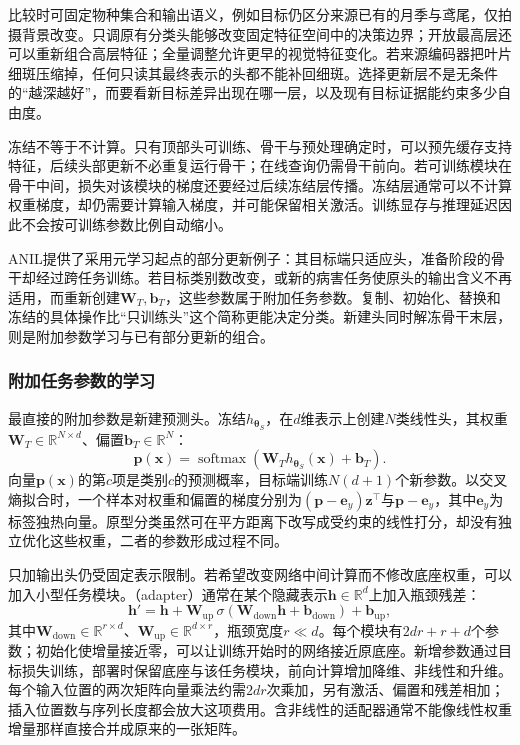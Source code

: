 比较时可固定物种集合和输出语义，例如目标仍区分来源已有的月季与鸢尾，仅拍摄背景改变。只调原有分类头能够改变固定特征空间中的决策边界；开放最高层还可以重新组合高层特征；全量调整允许更早的视觉特征变化。若来源编码器把叶片细斑压缩掉，任何只读其最终表示的头都不能补回细斑。选择更新层不是无条件的“越深越好”，而要看新目标差异出现在哪一层，以及现有目标证据能约束多少自由度。

冻结不等于不计算。只有顶部头可训练、骨干与预处理确定时，可以预先缓存支持特征，后续头部更新不必重复运行骨干；在线查询仍需骨干前向。若可训练模块在骨干中间，损失对该模块的梯度还要经过后续冻结层传播。冻结层通常可以不计算权重梯度，却仍需要计算输入梯度，并可能保留相关激活。训练显存与推理延迟因此不会按可训练参数比例自动缩小。

ANIL提供了采用元学习起点的部分更新例子：其目标端只适应头，准备阶段的骨干却经过跨任务训练。若目标类别数改变，或新的病害任务使原头的输出含义不再适用，而重新创建$\bm W_T,\bm b_T$，这些参数属于附加任务参数。复制、初始化、替换和冻结的具体操作比“只训练头”这个简称更能决定分类。新建头同时解冻骨干末层，则是附加参数学习与已有部分更新的组合。

\subsubsection{附加任务参数的学习}
\label{sec:ket-transfer-added-parameters}

最直接的附加参数是新建预测头。冻结$h_{\bm{\theta}_S}$，在$d$维表示上创建$N$类线性头，其权重$\bm W_T\in\mathbb R^{N\times d}$、偏置$\bm b_T\in\mathbb R^N$：
\begin{equation}
  \bm p(\bm x)
   =\operatorname{softmax}(\bm W_T h_{\bm{\theta}_S}(\bm x)+\bm b_T).
  \label{eq:ket-transfer-new-head}
\end{equation}
向量$\bm p(\bm x)$的第$c$项是类别$c$的预测概率，目标端训练$N(d+1)$个新参数。以交叉熵拟合时，一个样本对权重和偏置的梯度分别为$(\bm p-\bm e_y)\bm z^\top$与$\bm p-\bm e_y$，其中$\bm e_y$为标签独热向量。原型分类虽然可在平方距离下改写成受约束的线性打分，却没有独立优化这些权重，二者的参数形成过程不同。

只加输出头仍受固定表示限制。若希望改变网络中间计算而不修改底座权重，可以加入小型任务模块。（adapter）通常在某个隐藏表示$\bm h\in\mathbb R^d$上加入瓶颈残差：
\begin{equation}
  \bm h'=\bm h+
     \bm W_{\mathrm{up}}\,
       \sigma(\bm W_{\mathrm{down}}\bm h+\bm b_{\mathrm{down}})
       +\bm b_{\mathrm{up}},
  \label{eq:ket-transfer-adapter}
\end{equation}
其中$\bm W_{\mathrm{down}}\in\mathbb R^{r\times d}$、$\bm W_{\mathrm{up}}\in\mathbb R^{d\times r}$，瓶颈宽度$r\ll d$。每个模块有$2dr+r+d$个参数；初始化使增量接近零，可以让训练开始时的网络接近原底座。新增参数通过目标损失训练，部署时保留底座与该任务模块，前向计算增加降维、非线性和升维。每个输入位置的两次矩阵向量乘法约需$2dr$次乘加，另有激活、偏置和残差相加；插入位置数与序列长度都会放大这项费用。含非线性的适配器通常不能像线性权重增量那样直接合并成原来的一张矩阵。

